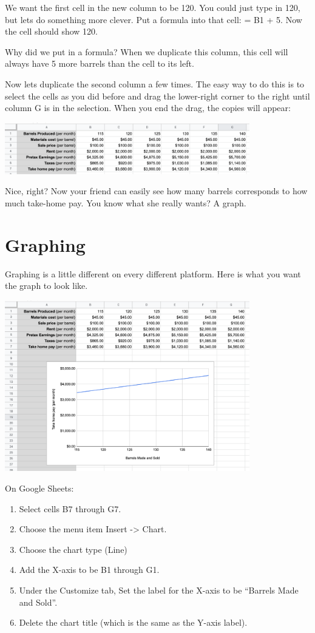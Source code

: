 We want the first cell in the new column to be 120. You could just
type in 120, but lets do something more clever.  Put a formula into that
cell: = B1 + 5.  Now the cell should show 120.

Why did we put in a formula? When we duplicate this column, this cell
will always have 5 more barrels than the cell to its left.

Now lets duplicate the second column a few times. The easy way to do
this is to select the cells as you did before and drag the lower-right
corner to the right until column G is in the selection. When you end
the drag, the copies will appear:

\includegraphics[width=0.8\textwidth]{BarrelDragPaste.png}

Nice, right? Now your friend can easily see how many barrels
corresponds to how much take-home pay. You know what she really wants? A graph.

\section{Graphing}

Graphing is a little different on every different platform.  Here is what you want the graph to look like.

\includegraphics[width=0.8\textwidth]{BarrelGraph.png}

On Google Sheets:

\begin{enumerate}
\item Select cells B7 through G7. 
\item Choose the menu item Insert -> Chart.
\item Choose the chart type (Line)
\item Add the X-axis to be B1 through G1.
\item Under the Customize tab, Set the label for the X-axis to be ``Barrels Made and Sold''.
\item Delete the chart title (which is the same as the Y-axis label).
\end{enumerate}

